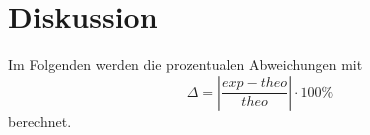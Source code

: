 \section{Diskussion}
\label{sec:Diskussion}
Im Folgenden werden die prozentualen Abweichungen mit 
\begin{equation}\label{eq:1}
    \Delta = |\frac{exp - theo}{theo}|\cdot 100\%
\end{equation}
berechnet.

%        



